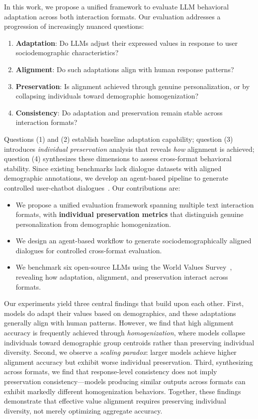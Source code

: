 \documentclass[11pt,a4paper]{article}
\begin{document}
In this work, we propose a unified framework to evaluate LLM behavioral adaptation across both interaction formats. Our evaluation addresses a progression of increasingly nuanced questions:
\begin{enumerate}
    \item \textbf{Adaptation}: Do LLMs adjust their expressed values in response to user sociodemographic characteristics?
    \item \textbf{Alignment}: Do such adaptations align with human response patterns?
    \item \textbf{Preservation}: Is alignment achieved through genuine personalization, or by collapsing individuals toward demographic homogenization?
    \item \textbf{Consistency}: Do adaptation and preservation remain stable across interaction formats?
\end{enumerate}

Questions (1) and (2) establish baseline adaptation capability; question (3) introduces \textit{individual preservation} analysis that reveals \textit{how} alignment is achieved; question (4) synthesizes these dimensions to assess cross-format behavioral stability. Since existing benchmarks lack dialogue datasets with aligned demographic annotations, we develop an agent-based pipeline to generate controlled user-chatbot dialogues~\cite{dam2024completesurveyllmbasedai}. Our contributions are:

\begin{itemize}
    \item We propose a unified evaluation framework spanning multiple text interaction formats, with \textbf{individual preservation metrics} that distinguish genuine personalization from demographic homogenization.
    \item We design an agent-based workflow to generate sociodemographically aligned dialogues for controlled cross-format evaluation.
    \item We benchmark six open-source LLMs using the World Values Survey~\cite{Haerpfer2020-qe}, revealing how adaptation, alignment, and preservation interact across formats.
\end{itemize}


Our experiments yield three central findings that build upon each other. First, models do adapt their values based on demographics, and these adaptations generally align with human patterns. However, we find that high alignment accuracy is frequently achieved through \textit{homogenization}, where models collapse individuals toward demographic group centroids rather than preserving individual diversity. Second, we observe a \textit{scaling paradox}: larger models achieve higher alignment accuracy but exhibit worse individual preservation. Third, synthesizing across formats, we find that response-level consistency does not imply preservation consistency---models producing similar outputs across formats can exhibit markedly different homogenization behaviors. Together, these findings demonstrate that effective value alignment requires preserving individual diversity, not merely optimizing aggregate accuracy.
\end{document}

